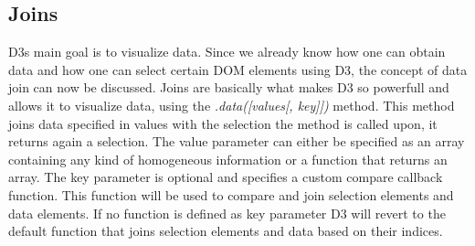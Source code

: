 \documentclass{bioinfo}
\begin{document}
\subsection{Joins}
D3s main goal is to visualize data. Since we already know how one can obtain data and how one can select certain DOM elements using D3, the concept of data join can now be discussed. Joins are basically what makes D3 so powerfull and allows it to visualize data, using the \textit{.data([values[, key]])} method.
This method joins data specified in values with the selection the method is called upon, it returns again a selection.
The value parameter can either be specified as an array containing any kind of homogeneous information or a function that returns an array.
The key parameter is optional and specifies a custom compare callback function.
This function will be used to compare and join selection elements and data elements.
If no function is defined as key parameter D3 will revert to the default function that joins selection elements and data based on their indices.
\end{document}
